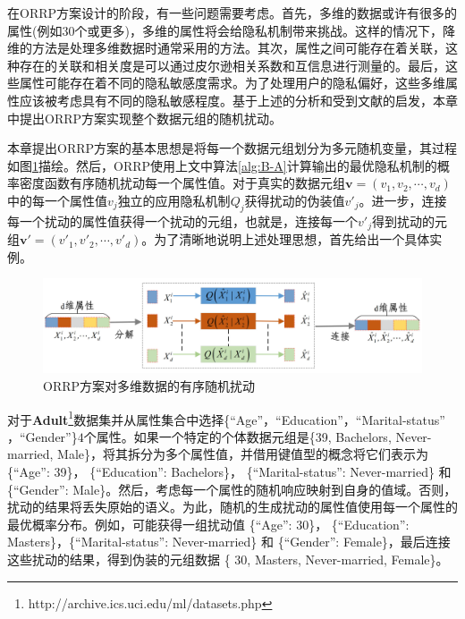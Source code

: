 在ORRP方案设计的阶段，有一些问题需要考虑。首先，多维的数据或许有很多的属性(例如$30$个或更多)，多维的属性将会给隐私机制带来挑战。这样的情况下，降维的方法是处理多维数据时通常采用的方法\cite{ren2018textsf,zhang2014privbayes}。其次，属性之间可能存在着关联，这种存在的关联和相关度是可以通过皮尔逊相关系数\cite{zhu2015correlated}和互信息\cite{chen2015differentially}进行测量的。最后，这些属性可能存在着不同的隐私敏感度需求。为了处理用户的隐私偏好，这些多维属性应该被考虑具有不同的隐私敏感程度\cite{murakami2019utility,gu2020providing}。基于上述的分析和受到文献的启发，本章中提出ORRP方案实现整个数据元组的随机扰动。

本章提出ORRP方案的基本思想是将每一个数据元组划分为多元随机变量，其过程如图\ref{fig:chapter06_Fig03}描绘。然后，ORRP使用上文中算法\ref{alg:B-A}计算输出的最优隐私机制的概率密度函数有序随机扰动每一个属性值。对于真实的数据元组$\bm{v}=(v_1,v_2,\cdots,v_d)$中的每一个属性值$v_j$独立的应用隐私机制$Q_j$获得扰动的伪装值$v'_j$。进一步，连接每一个扰动的属性值获得一个扰动的元组，也就是，连接每一个$v'_j$得到扰动的元组$\bm{v}'=(v'_1,v'_2,\cdots,v'_d)$。为了清晰地说明上述处理思想，首先给出一个具体实例。

\begin{figure}[htbp]
	\centering
	\includegraphics[width = 0.8\linewidth]{./figures/chapter06/chapter06_3.jpg}
	\caption{ORRP方案对多维数据的有序随机扰动}
	\label{fig:chapter06_Fig03}
\end{figure}

\begin{example}
	对于\textbf{Adult}\footnote{http://archive.ics.uci.edu/ml/datasets.php\label{ft:UCI}}数据集并从属性集合中选择\{``Age''，``Education''，``Marital-status''	，``Gender''\}$4$个属性。如果一个特定的个体数据元组是\{39, Bachelors, Never-married, Male\}，将其拆分为多个属性值，并借用键值型的概念将它们表示为 \{``Age'': 39\}， \{``Education'': Bachelors\}， \{``Marital-status'': Never-married\} 和 \{``Gender'': Male\}。然后，考虑每一个属性的随机响应映射到自身的值域。否则，扰动的结果将丢失原始的语义。为此，随机的生成扰动的属性值使用每一个属性的最优概率分布。例如，可能获得一组扰动值 \{``Age'': 30\}， \{``Education'': Masters\}，\{``Marital-status'': Never-married\} 和 \{``Gender'': Female\}，最后连接这些扰动的结果，得到伪装的元组数据 \{ 30, Masters, Never-married, Female\}。
\end{example}

